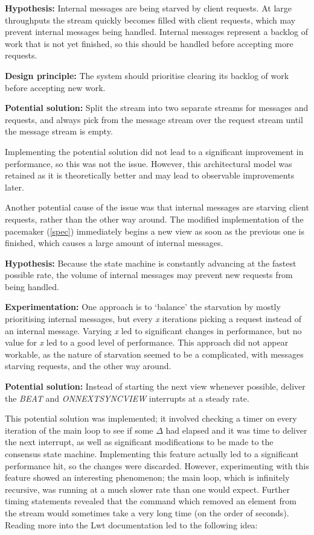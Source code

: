 \textbf{Hypothesis: } Internal messages are being starved by client requests. At large throughputs the stream quickly becomes filled with client requests, which may prevent internal messages being handled. Internal messages represent a backlog of work that is not yet finished, so this should be handled before accepting more requests.

\textbf{Design principle: } The system should prioritise clearing its backlog of work before accepting new work.

\textbf{Potential solution: } Split the stream into two separate streams for messages and requests, and always pick from the message stream over the request stream until the message stream is empty.

Implementing the potential solution did not lead to a significant improvement in performance, so this was not the issue. However, this architectural model was retained as it is theoretically better and may lead to observable improvements later.

Another potential cause of the issue was that internal messages are starving client requests, rather than the other way around. The modified implementation of the pacemaker (\ref{spec}) immediately begins a new view as soon as the previous one is finished, which causes a large amount of internal messages.

\textbf{Hypothesis: } Because the state machine is constantly advancing at the fastest possible rate, the volume of internal messages may prevent new requests from being handled.

\textbf{Experimentation: } One approach is to `balance' the starvation by mostly prioritising internal messages, but every \textit{x} iterations picking a request instead of an internal message. Varying \textit{x} led to significant changes in performance, but no value for \textit{x} led to a good level of performance. This approach did not appear workable, as the nature of starvation seemed to be a complicated, with messages starving requests, and the other way around.

\textbf{Potential solution: } Instead of starting the next view whenever possible, deliver the \textit{BEAT} and \textit{ON{\large N}EXT{\large S}YNC{\large V}IEW} interrupts at a steady rate.

This potential solution was implemented; it involved checking a timer on every iteration of the main loop to see if some $\Delta$ had elapsed and it was time to deliver the next interrupt, as well as significant modifications to be made to the consensus state machine. Implementing this feature actually led to a significant performance hit, so the changes were discarded. However, experimenting with this feature showed an interesting phenomenon; the main loop, which is infinitely recursive, was running at a much slower rate than one would expect. Further timing statements revealed that the command which removed an element from the stream would sometimes take a very long time (on the order of seconds). Reading more into the Lwt documentation led to the following idea:

